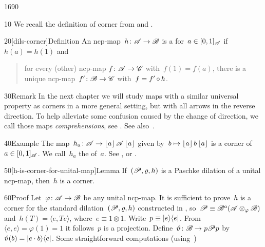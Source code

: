 \begin{parsec}{1690}%
\begin{point}{10}%
We recall the definition of corner
        from \cite[Dfn.~2]{westerbaan2016universal} and .
\end{point}
\begin{point}{20}[dils-corner]{Definition}%
An ncp-map~$h \colon \mathscr{A} \to \mathscr{B}$
is a  for~$a \in [0,1]_{\mathscr{A}}$ if~$h(a)=h(1)$
    and
    \begin{quote}
        for every (other) ncp-map $f\colon \mathscr{A} \to \mathscr{C}$
            with~$f(1)=f(a)$,
            there is a unique ncp-map~$f'\colon \mathscr{B} \to \mathscr{C}$
            with~$f = f' \mathop{\circ} h$.
    \end{quote}
\begin{point}{30}{Remark}%
In the next chapter we will study maps with a similar universal property
    as corners in a more general setting,
    but with all arrows in the reverse direction.
To help alleviate some confusion caused by the change of direction,
    we call those maps \emph{comprehensions},
    see .  See also~\cite{effintro}.
\end{point}
\end{point}
\begin{point}{40}{Example}%
    The map~$h_a \colon \mathscr{A} \to \left\lfloor a\right\rfloor \mathscr{A} \left\lfloor a\right\rfloor$ given
    by~$b \mapsto \left\lfloor a\right\rfloor b \left\lfloor a\right\rfloor$
    is a corner of~$a \in [0,1]_{\mathscr{A}}$.
    We call~$h_a$ the  of~$a$.
    See , 
        or \cite[Prop.~5]{westerbaan2016universal}.
\end{point}
\begin{point}{50}[h-is-corner-for-unital-map]{Lemma}%
If~$(\mathscr{P}, \varrho, h)$ is a Paschke dilation of a unital ncp-map,
    then~$h$ is a corner.
\begin{point}{60}{Proof}%
Let~$\varphi \colon \mathscr{A} \to \mathscr{B}$ be any unital ncp-map.
It is sufficient to prove~$h$
    is a corner for the
    standard dilation~$(\mathscr{P} , \varrho, h)$
    constructed in ,
    so~$\mathscr{P} \equiv \mathscr{B}^a(\mathscr{A} \otimes_\varphi \mathscr{B})$
    and~$h(T) = \langle e, T e\rangle$, where~$e \equiv 1\otimes 1$.
    Write~$p \equiv \left|e\right>\!\left<e\right|$.
From~$\langle e,e\rangle = \varphi(1) = 1$
    it follows~$p$ is a projection.
Define~$\vartheta\colon \mathscr{B} \to p \mathscr{P} p$
    by~$\vartheta(b) = \left|e \cdot b\right>\!\left<e\right|$.
    Some straightforward computations (using~)

\end{point}
\end{point}
\end{parsec}
